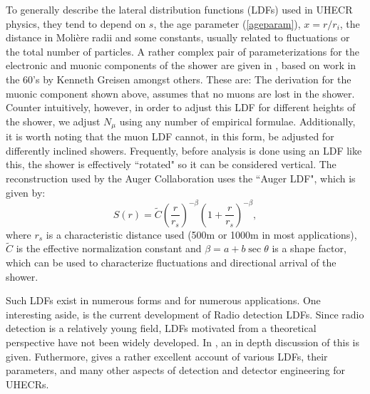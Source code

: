 To generally describe the lateral distribution functions (LDFs) used in UHECR physics, they tend to depend on $s$, the age parameter (\autoref{ageparam}), $x=r/r_i$, the distance in Moli\`{e}re radii and some constants, usually related to fluctuations or the total number of particles. A rather complex pair of parameterizations for the electronic and muonic components of the shower are given in \textcite{crapp2}, based on work in the 60's by Kenneth Greisen amongst others. These are:
The derivation for the muonic component shown above, assumes that no muons are lost in the shower. Counter intuitively, however, in order to adjust this LDF for different heights of the shower, we adjust $N_\mu$ using any number of empirical formulae. Additionally, it is worth noting that the muon LDF cannot, in this form, be adjusted for differently inclined showers. Frequently, before analysis is done using an LDF like this, the shower is effectively ``rotated" so it can be considered vertical. The reconstruction used by the Auger Collaboration uses the ``Auger LDF", which is given by:
$$S(r)=\tilde C \left(\frac{r}{r_s}\right)^{-\beta}\left(1+\frac{r}{r_s}\right)^{-\beta},$$
where $r_s$ is a characteristic distance used (500m or 1000m in most applications), $\tilde{C}$ is the effective normalization constant and $\beta=a+b\sec\theta$ is a shape factor, which can be used to characterize fluctuations and directional arrival of the shower. 

Such LDFs exist in numerous forms and for numerous applications. One interesting aside, is the current development of Radio detection LDFs. Since radio detection is a relatively young field, LDFs motivated from a theoretical perspective have not been widely developed. In \textcite{schroeder}, an in depth discussion of this is given. Futhermore, \textcite{ldfcat} gives a rather excellent account of various LDFs, their parameters, and many other aspects of detection and detector engineering for UHECRs. 
